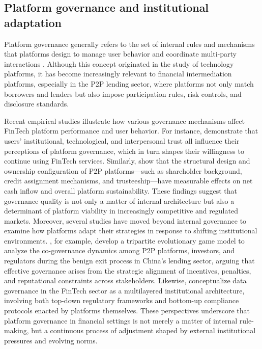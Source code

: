 \documentclass[pdflatex,sn-apa]{sn-jnl}%
\theoremstyle{thmstyleone}%
\theoremstyle{thmstyletwo}%
\theoremstyle{thmstylethree}%
\begin{document}
\subsection{Platform governance and institutional adaptation}

\textcolor{NavyBlue}{Platform governance generally refers to the set of internal rules and mechanisms that platforms design to manage user behavior and coordinate multi-party interactions \citep{tiwana_chapter_2014}. Although this concept originated in the study of technology platforms, it has become increasingly relevant to financial intermediation platforms, especially in the P2P lending sector, where platforms not only match borrowers and lenders but also impose participation rules, risk controls, and disclosure standards.}

\textcolor{NavyBlue}{Recent empirical studies illustrate how various governance mechanisms affect FinTech platform performance and user behavior. For instance, \citet{Xia2023648} demonstrate that users’ institutional, technological, and interpersonal trust all influence their perceptions of platform governance, which in turn shapes their willingness to continue using FinTech services. Similarly, \citet{Chen20211055} show that the structural design and ownership configuration of P2P platforms—such as shareholder background, credit assignment mechanisms, and trusteeship—have measurable effects on net cash inflow and overall platform sustainability. These findings suggest that governance quality is not only a matter of internal architecture but also a determinant of platform viability in increasingly competitive and regulated markets. Moreover, several studies have moved beyond internal governance to examine how platforms adapt their strategies in response to shifting institutional environments. \citet{Wang2022}, for example, develop a tripartite evolutionary game model to analyze the co-governance dynamics among P2P platforms, investors, and regulators during the benign exit process in China’s lending sector, arguing that effective governance arises from the strategic alignment of incentives, penalties, and reputational constraints across stakeholders. Likewise, \citet{Lee20221} conceptualize data governance in the FinTech sector as a multilayered institutional architecture, involving both top-down regulatory frameworks and bottom-up compliance protocols enacted by platforms themselves. These perspectives underscore that platform governance in financial settings is not merely a matter of internal rule-making, but a continuous process of adjustment shaped by external institutional pressures and evolving norms.}
\end{document}
